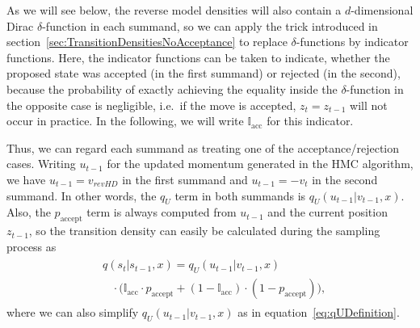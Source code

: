 As we will see below, the reverse model densities will also contain a $d$-dimensional Dirac $\delta$-function in each summand, so we can apply the trick introduced in section~\ref{sec:TransitionDensitiesNoAcceptance} to replace $\delta$-functions by indicator functions. Here, the indicator functions can be taken to indicate, whether the proposed state was accepted (in the first summand) or rejected (in the second), because the probability of exactly achieving the equality inside the $\delta$-function in the opposite case is negligible, i.e.\ if the move is accepted, $z_t = z_{t-1}$ will not occur in practice. In the following, we will write $\mathbb{I}_\textrm{acc}$ for this indicator.

Thus, we can regard each summand as treating one of the acceptance/rejection cases. Writing $u_{t-1}$ for the updated momentum generated in the HMC algorithm, we have $u_{t-1} = v_{revHD}$ in the first summand and $u_{t-1} = -v_t$ in the second summand. In other words, the $q_U$ term in both summands is $q_U(u_{t-1}|v_{t-1}, x)$. Also, the $p_\textrm{accept}$ term is always computed from $u_{t-1}$ and the current position $z_{t-1}$, so the transition density can easily be calculated during the sampling process as
\begin{align}
\begin{split}
&q(s_t|s_{t-1}, x) = q_U(u_{t-1}|v_{t-1}, x) \\
&\;\;\;\cdot \Big( \mathbb{I}_\textrm{acc} \cdot p_{\textrm{accept}} + (1 - \mathbb{I}_\textrm{acc}) \cdot (1- p_{\textrm{accept}}) \Big),
\end{split}
\end{align}
where we can also simplify $q_U(u_{t-1}|v_{t-1}, x)$ as in equation~\eqref{eq:qUDefinition}.

